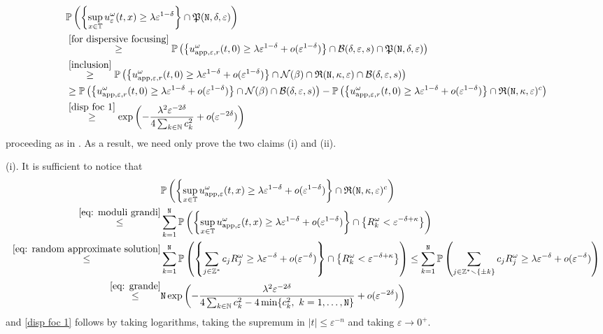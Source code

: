 \documentclass[a4paper,10pt,reqno]{article}
\theoremstyle{definition}
\theoremstyle{plain}
\theoremstyle{plain}
\theoremstyle{definition}
\theoremstyle{plain}
\theoremstyle{plain}
\theoremstyle{plain}
\theoremstyle{definition}
\theoremstyle{definition}
\def \N{\mathbb N}
\def \Z{\mathbb Z}
\def \P{{\mathbb P}}
\def \T{\mathbb{T}}
\def \B{\mathcal{B}}
\def \tN{\mathtt{N}}
\begin{document}
\[
\begin{split}
& \P \left( \left \{ \sup_{x \in \T} u_{\varepsilon}^{\omega}(t,x) \ge \lambda \varepsilon^{1-\delta} \right \} \cap \mathfrak{P}(\tN,\delta,\varepsilon) \right) \\
& \stackrel{\eqref{for dispersive focusing}}{\ge} \P \left( \left \{ u_{\mathrm{app},\varepsilon,r}^{\omega}(t,0) \ge \lambda \varepsilon^{1-\delta} + o(\varepsilon^{1-\delta}) \right \} \cap \B(\delta,\varepsilon,s) \cap \mathfrak{P}(\tN,\delta,\varepsilon)  \right ) \\
& \stackrel{\eqref{inclusion}}{\ge} \P \left( \left \{ u_{\mathrm{app},\varepsilon,r}^{\omega}(t,0) \ge \lambda \varepsilon^{1-\delta} + o(\varepsilon^{1-\delta}) \right \} \cap \mathcal{N}(\beta) \cap \mathfrak{R}(\tN, \kappa, \varepsilon) \cap \B(\delta,\varepsilon,s)  \right ) \\
& \ge \P \left( \left \{ u_{\mathrm{app},\varepsilon,r}^{\omega}(t,0) \ge \lambda \varepsilon^{1-\delta} + o(\varepsilon^{1-\delta}) \right \} \cap \mathcal{N}(\beta) \cap \B(\delta,\varepsilon,s)  \right ) - \P \left( \left \{ u_{\mathrm{app},\varepsilon,r}^{\omega}(t,0) \ge \lambda \varepsilon^{1-\delta} + o(\varepsilon^{1-\delta}) \right \} \cap \mathfrak{R}(\tN, \kappa, \varepsilon)^c  \right ) \\
& \stackrel{\eqref{disp foc 1}}{\ge} \exp \left ( -\frac{\lambda^2 \varepsilon^{-2\delta}}{4 \sum_{k \in \N} c_k^2} + o(\varepsilon^{-2\delta}) \right )
\end{split}
\]
proceeding as in . As a result, we need only prove the two claims (i) and (ii).

\medskip

(i). It is sufficient to notice that
\[
\begin{split}
& \P \left( \left \{ \sup_{x \in \T} u_{\mathrm{app},\varepsilon}^{\omega}(t,x) \ge \lambda \varepsilon^{1-\delta} + o(\varepsilon^{1-\delta}) \right \} \cap \mathfrak{R}(\tN,\kappa,\varepsilon)^c \right) \\
\stackrel{\eqref{eq: moduli grandi}}{\le} & \sum_{k=1}^{\tN} \P \left( \left \{ \sup_{x \in \T} u_{\mathrm{app},\varepsilon}^{\omega}(t,x) \ge \lambda \varepsilon^{1-\delta} + o(\varepsilon^{1-\delta}) \right \} \cap \left \{ R_k^{\omega} < \varepsilon^{-\delta + \kappa} \right \} \right) \\
\stackrel{\eqref{eq: random approximate solution}}{\le} & \sum_{k=1}^{\tN} \P \left( \left \{ \sum_{j \in \Z^*} c_j R_j^{\omega} \ge \lambda \varepsilon^{-\delta} + o(\varepsilon^{-\delta}) \right \} \cap \left \{ R_k^{\omega} < \varepsilon^{-\delta + \kappa} \right \} \right) \le \sum_{k=1}^{\tN} \P \left( \sum_{j \in \Z^* \smallsetminus \{ \pm k \} } c_j R_j^{\omega} \ge \lambda \varepsilon^{-\delta} + o(\varepsilon^{-\delta}) \right) \\
\stackrel{\eqref{eq: grande}}{\le} & \tN \exp \left ( -\frac{\lambda^2 \varepsilon^{-2\delta}}{4 \sum_{k \in \N} c_k^2 - 4 \min \{ c_k^2,  \, \, k=1,\ldots,\tN \}} + o(\varepsilon^{-2\delta}) \right )
\end{split}
\]
and \eqref{disp foc 1} follows by taking logarithms, taking the supremum in $|t|\leq \varepsilon^{-n}$ and taking $\varepsilon\rightarrow 0^{+}$.
\end{document}
